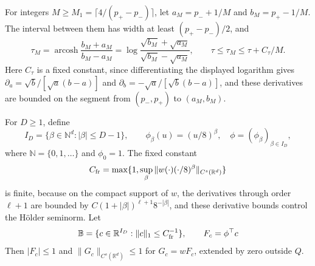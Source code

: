 For integers $M\ge M_1=\lceil4/(p_+-p_-)\rceil$, let
$a_M=p_-+1/M$ and $b_M=p_+-1/M$. The interval between them has width
at least $(p_+-p_-)/2$, and
\begin{equation}\label{eq:LB-tauM}
 \tau_M=\operatorname{arcosh}\frac{b_M+a_M}{b_M-a_M}
 =\log\frac{\sqrt{b_M}+\sqrt{a_M}}{\sqrt{b_M}-\sqrt{a_M}},
 \qquad \tau\le\tau_M\le\tau+C_\tau/M.
\end{equation}
Here $C_\tau$ is a fixed constant, since differentiating the
displayed logarithm gives $\partial_a=\sqrt b/[\sqrt a(b-a)]$ and
$\partial_b=-\sqrt a/[\sqrt b(b-a)]$, and these derivatives are
bounded on the segment from $(p_-,p_+)$ to $(a_M,b_M)$.

For $D\ge1$, define
\begin{equation}\label{eq:frame}
 I_D=\{\beta\in\mathbb N^d:|\beta|\le D-1\},\qquad
 \phi_\beta(u)=(u/8)^\beta,\quad \phi=(\phi_\beta)_{\beta\in I_D},
\end{equation}
where $\mathbb N=\{0,1,\ldots\}$ and $\phi_0=1$. The fixed constant
\[
C_{\rm fr}=\max\{1,\sup_\beta\|w(\cdot)(\cdot/8)^\beta\|_{C^s(\mathbb R^d)}\}
\]
is finite, because on the compact support of $w$, the derivatives
through order $\ell+1$ are bounded by
$C(1+|\beta|)^{\ell+1}8^{-|\beta|}$, and these derivative bounds
control the H\"older seminorm. Let
\begin{equation}\label{eq:LB-coefficient-ball}
 \mathbb B=\{c\in\mathbb R^{I_D}:\|c\|_1\le C_{\rm fr}^{-1}\},
 \qquad F_c=\phi^\top c
\end{equation}
Then $|F_c|\le1$ and $\|G_c\|_{C^s(\mathbb R^d)}\le1$ for
$G_c=wF_c$, extended by zero outside $Q$.

